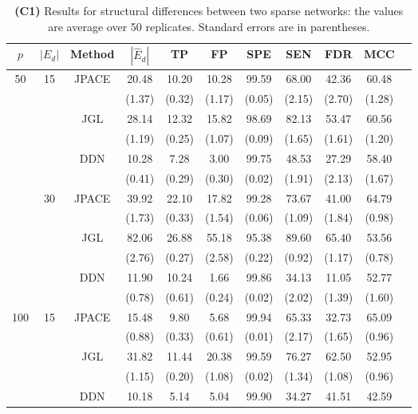 \documentclass[useAMS,usenatbib,referee]{bio}
\begin{document}
{\begin{table}[htb!]
\caption{{\bf (C1)} Results for structural differences between two sparse
networks: the values are average over 50 replicates.
Standard errors are in parentheses.
}
\medskip
\centering
{ %
\begin{tabular}{||c|c|c||c|c|c|c|c|c|c||c} \cline{1-10}
$p$  &  $|E_d|$  & Method & $|\hat{E}_d|$ & TP & FP & SPE & SEN & FDR & MCC \\ \hline 
\multirow{12}{*}{50}  &\multirow{6}{*}{15}  & \multirow{2}{*}{JPACE} &20.48 & 10.20 & 10.28 & 99.59 & 68.00 & 42.36 & 60.48 \\ 
& & & (1.37) & (0.32) & (1.17) & (0.05) & (2.15) & (2.70) & (1.28) \\ \cline{3-10} 
& & \multirow{2}{*}{JGL} & 28.14 & 12.32 & 15.82 & 98.69 & 82.13 & 53.47 & 60.56 \\ 
 & & & (1.19) & (0.25) & (1.07) & (0.09) & (1.65) & (1.61) & (1.20) \\ \cline{3-10} 
& & \multirow{2}{*}{DDN} & 10.28 & 7.28 & 3.00 & 99.75 & 48.53 & 27.29 & 58.40 \\ 
 & & & (0.41) & (0.29) & (0.30) & (0.02) & (1.91) & (2.13) & (1.67) \\\cline{2-10} 
  &\multirow{6}{*}{30}  & \multirow{2}{*}{JPACE} &39.92 & 22.10 & 17.82 & 99.28 & 73.67 & 41.00 & 64.79 \\ 
& & & (1.73) & (0.33) & (1.54) & (0.06) & (1.09) & (1.84) & (0.98) \\ \cline{3-10} 
& & \multirow{2}{*}{JGL} & 82.06 & 26.88 & 55.18 & 95.38 & 89.60 & 65.40 & 53.56 \\ 
 & & & (2.76) & (0.27) & (2.58) & (0.22) & (0.92) & (1.17) & (0.78) \\ \cline{3-10} 
& & \multirow{2}{*}{DDN} & 11.90 & 10.24 & 1.66 & 99.86 & 34.13 & 11.05 & 52.77 \\ 
 & & & (0.78) & (0.61) & (0.24) & (0.02) & (2.02) & (1.39) & (1.60) \\\cline{1-10} 
\multirow{12}{*}{100}  &\multirow{6}{*}{15}  & \multirow{2}{*}{JPACE} &15.48 & 9.80 & 5.68 & 99.94 & 65.33 & 32.73 & 65.09 \\ 
& & & (0.88) & (0.33) & (0.61) & (0.01) & (2.17) & (1.65) & (0.96) \\ \cline{3-10} 
& & \multirow{2}{*}{JGL} & 31.82 & 11.44 & 20.38 & 99.59 & 76.27 & 62.50 & 52.95 \\ 
 & & & (1.15) & (0.20) & (1.08) & (0.02) & (1.34) & (1.08) & (0.96) \\ \cline{3-10} 
& & \multirow{2}{*}{DDN} & 10.18 & 5.14 & 5.04 & 99.90 & 34.27 & 41.51 & 42.59 \\ 

\end{tabular}}
\end{table}}
\end{document}
